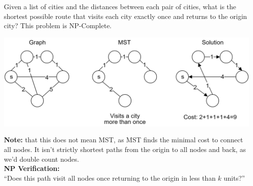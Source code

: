 \newpage 
\begin{theo}

    \label{TSP}

    Given a list of cities and the distances between each pair of cities, 
    what is the shortest possible route that visits each city exactly once and returns to the origin city?
    This problem is NP-Complete. 

    \begin{center}
    \includegraphics[width=1\textwidth]{Sections/hard/graphs.png}
    \end{center}
    \noindent
    \textbf{Note:} that this does not mean MST, as MST finds the minimal cost to connect all nodes. It isn't strictly shortest paths
    from the origin to all nodes and back, as we'd double count nodes.\\

    \noindent
    \textbf{NP Verification:}\\
    ``Does this path visit all nodes once returning to the origin in less than $k$ units?''

\end{theo}
    